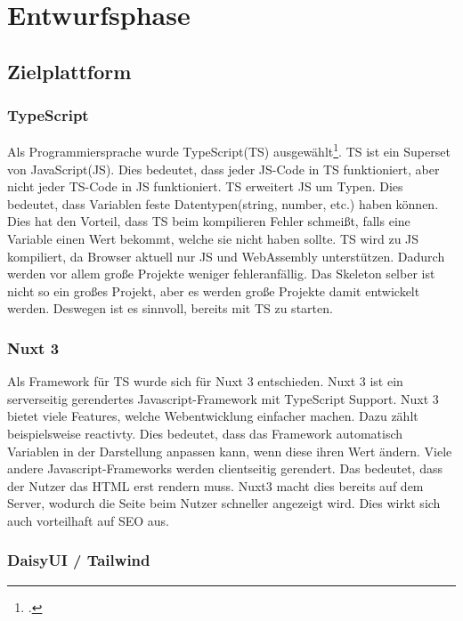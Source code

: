 \section{Entwurfsphase} 
\label{sec:Entwurfsphase}

\subsection{Zielplattform}
\label{sec:Zielplattform}

\subsubsection{TypeScript}
\label{sec:TypeScript}

Als Programmiersprache wurde TypeScript(\acs{TS}) ausgewählt\footnote{\Vgl \citet{TypeScript}.}. \acs{TS} ist ein Superset von JavaScript(\acs{JS}). Dies bedeutet, dass jeder JS-Code in \acs{TS} funktioniert, aber nicht jeder \acs{TS}-Code in JS funktioniert. \acs{TS} erweitert JS um Typen. Dies bedeutet, dass Variablen feste Datentypen(string, number, etc.) haben können. Dies hat den Vorteil, dass \acs{TS} beim kompilieren Fehler schmeißt, falls eine Variable einen Wert bekommt, welche sie nicht haben sollte. \acs{TS} wird zu JS kompiliert, da Browser aktuell nur JS und WebAssembly unterstützen. Dadurch werden vor allem große Projekte weniger fehleranfällig. Das Skeleton selber ist nicht so ein großes Projekt, aber es werden große Projekte damit entwickelt werden. Deswegen ist es sinnvoll, bereits mit \acs{TS} zu starten.

\subsubsection{Nuxt 3}
\label{sec:Nuxt 3}

Als Framework für TS wurde sich für Nuxt 3 entschieden. Nuxt 3 ist ein serverseitig gerendertes Javascript-Framework mit TypeScript Support. Nuxt 3 bietet viele Features, welche Webentwicklung einfacher machen. Dazu zählt beispielsweise reactivty. Dies bedeutet, dass das Framework automatisch Variablen in der Darstellung anpassen kann, wenn diese ihren Wert ändern. Viele andere Javascript-Frameworks werden clientseitig gerendert. Das bedeutet, dass der Nutzer das HTML erst rendern muss. Nuxt3 macht dies bereits auf dem Server, wodurch die Seite beim Nutzer schneller angezeigt wird. Dies wirkt sich auch vorteilhaft auf SEO aus.

\subsubsection{DaisyUI / Tailwind}
\label{sec:DaisyUI / Tailwind}

